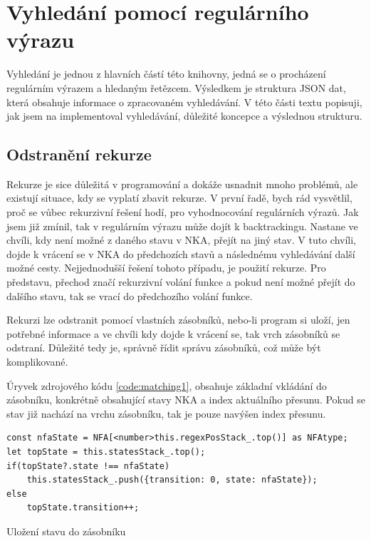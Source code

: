 \section{Vyhledání pomocí regulárního výrazu}\label{sec:PatternMatching}

Vyhledání je jednou z hlavních částí této knihovny, jedná se o procházení regulárním výrazem a hledaným řetězcem.
Výsledkem je struktura JSON dat, která obsahuje informace o zpracovaném vyhledávání.
V této části textu popisuji, jak jsem na implementoval vyhledávání, důležité koncepce a výslednou strukturu.

\subsection*{Odstranění rekurze}

Rekurze je sice důležitá v programování a dokáže usnadnit mnoho problémů, ale existují situace, kdy se vyplatí zbavit rekurze.
V první řadě, bych rád vysvětlil, proč se vůbec rekurzivní řešení hodí, pro vyhodnocování regulárních výrazů.
Jak jsem již zmínil, tak v regulárním výrazu může dojít k backtrackingu.
Nastane ve chvíli, kdy není možné z daného stavu v NKA, přejít na jiný stav.
V tuto chvíli, dojde k vrácení se v NKA do předchozích stavů a následnému vyhledávání další možné cesty.
Nejjednodušší řešení tohoto případu, je použití rekurze.
Pro představu, přechod značí rekurzivní volání funkce a pokud není možné přejít do dalšího stavu, tak se vrací do předchozího volání funkce.

Rekurzi lze odstranit pomocí vlastních zásobníků, nebo-li program si uloží, jen potřebné informace a ve chvíli kdy dojde k vrácení se, tak vrch zásobníků se odstraní.
Důležité tedy je, správně řídit správu zásobníků, což může být komplikované.

Úryvek zdrojového kódu \ref{code:matching1}, obsahuje základní vkládání do zásobníku, konkrétně obsahující stavy NKA a index aktuálního přesunu.
Pokud se stav již nachází na vrchu zásobníku, tak je pouze navýšen index přesunu.

\begin{code}[!ht]
	\begin{verbatim}
const nfaState = NFA[<number>this.regexPosStack_.top()] as NFAtype;
let topState = this.statesStack_.top();
if(topState?.state !== nfaState)
	this.statesStack_.push({transition: 0, state: nfaState});
else
	topState.transition++;
	\end{verbatim}
	\caption{Uložení stavu do zásobníku}
	\label{code:matching1}
\end{code}

